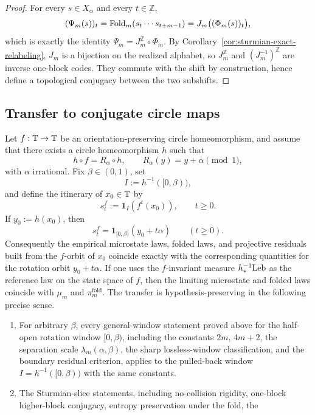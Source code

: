 \begin{proof}
For every \(s\in X_\alpha\) and every \(t\in\mathbb Z\),
\[
(\Psi_m(s))_t
=
\mathrm{Fold}_m(s_t\cdots s_{t+m-1})
=
J_m\bigl((\Phi_m(s))_t\bigr),
\]
which is exactly the identity \(\Psi_m=J_m^{\mathbb Z}\circ\Phi_m\). By
Corollary~\ref{cor:sturmian-exact-relabeling}, \(J_m\) is a bijection on the
realized alphabet, so \(J_m^{\mathbb Z}\) and \((J_m^{-1})^{\mathbb Z}\) are
inverse one-block codes. They commute with the shift by construction, hence
define a topological conjugacy between the two subshifts.
\end{proof}
\subsection{Transfer to conjugate circle maps}

\begin{theorem}
\label{thm:circle-map-conjugacy-transfer}
Let \(f:\mathbb{T}\to\mathbb{T}\) be an orientation-preserving circle homeomorphism, and
assume that there exists a circle homeomorphism \(h\) such that
\[
h\circ f=R_\alpha\circ h,
\qquad
R_\alpha(y)=y+\alpha \pmod 1,
\]
with \(\alpha\) irrational. Fix \(\beta\in(0,1)\), set
\[
I:=h^{-1}([0,\beta)),
\]
and define the itinerary of \(x_0\in\mathbb{T}\) by
\[
s_t^f:=\mathbf 1_I(f^t(x_0)),
\qquad t\ge0.
\]
If \(y_0:=h(x_0)\), then
\[
s_t^f=\mathbf 1_{[0,\beta)}(y_0+t\alpha)
\qquad (t\ge0).
\]
Consequently the empirical microstate laws, folded laws, and projective
residuals built from the \(f\)-orbit of \(x_0\) coincide exactly with the
corresponding quantities for the rotation orbit \(y_0+t\alpha\). If one uses
the \(f\)-invariant measure \(h^{-1}_*\mathrm{Leb}\) as the reference law on the
state space of \(f\), then the limiting microstate and folded laws coincide
with \(\mu_m\) and \(\pi_m^{\mathrm{fold}}\). The transfer is
hypothesis-preserving in the following precise sense.
\begin{enumerate}
\item For arbitrary \(\beta\), every general-window statement proved above for
the half-open rotation window \([0,\beta)\), including the constants \(2m\),
\(4m+2\), the separation scale \(\lambda_m(\alpha,\beta)\), the sharp
lossless-window classification, and the boundary residual criterion, applies
to the pulled-back window \(I=h^{-1}([0,\beta))\) with the same constants.
\item The Sturmian-slice statements, including no-collision rigidity,
one-block higher-block conjugacy, entropy preservation under the fold, the

\end{enumerate}
\end{theorem}
